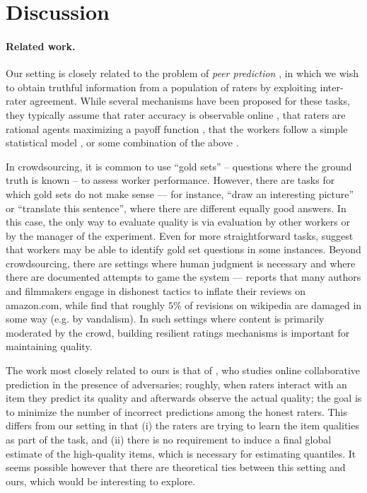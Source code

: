\section{Discussion}
\label{sec:discussion}


\paragraph{Related work.}
Our setting is closely related to the problem of \emph{peer prediction} 
\citep{miller2005eliciting}, in which we wish to obtain truthful information 
from a population of raters by exploiting inter-rater agreement. 
While several mechanisms have been proposed for these tasks, 
they typically assume that rater accuracy is observable online
\citep{resnick2007influence}, that raters are 
rational agents maximizing a payoff function \citep{dasgupta2013crowdsourced,
kamble2015truth,shnayder2016strong}, that the workers follow a simple 
statistical model \citep{karger2014budget,zhang2014crowdsourcing,
zhou2015regularized}, or some combination of the above \citep{shah2015double,
shah2015approval}. 

In crowdsourcing, it is common to use ``gold sets'' -- questions where the 
ground truth is known -- to assess worker performance. 
However, there are tasks for which gold sets do not make sense
--- for instance, ``draw an interesting picture'' or ``translate this sentence'', 
where there are different equally good answers. In this case, the only way to 
evaluate quality is via evaluation by other workers or by the manager of 
the experiment. Even for more straightforward tasks, \citet{vuurens2011spam} 
suggest that workers may be able to identify gold set questions in some 
instances. Beyond crowdsourcing, there are settings where human judgment is 
necessary and where there are documented attempts to game the system --- 
\citet{harmon2004amazon} reports that many authors and filmmakers 
engage in dishonest tactics to inflate their reviews on amazon.com, while 
\citet{priedhorsky2007creating} find that roughly $5\%$ of revisions on 
wikipedia are damaged in some way (e.g. by vandalism). In such settings where 
content is primarily moderated by the crowd, building resilient ratings 
mechanisms is important for maintaining quality.

The work most closely related to ours is that of \citet{christiano2014provably,
christiano2016robust}, who studies online collaborative prediction in 
the presence of adversaries; roughly, when raters interact with an item 
they predict its quality and afterwards observe the actual quality; the 
goal is to minimize the number of incorrect 
predictions among the honest raters. This differs from our setting in that 
(i) the raters are trying to learn the item qualities as part of the task, 
and (ii) there is no requirement to induce a final global estimate of the 
high-quality items, which is necessary for estimating quantiles.
It seems possible however that there are theoretical ties between this 
setting and ours, which would be interesting to explore.
